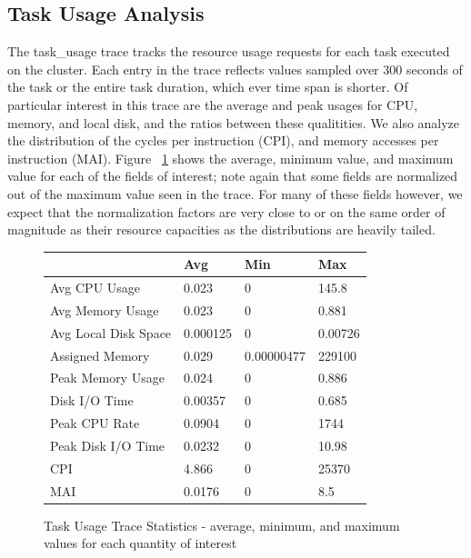 \documentclass{sig-alternate}
\begin{document}



\subsection{Task Usage Analysis}

The task\_usage trace tracks the resource usage requests for each task executed on the cluster.
Each entry in the trace reflects values sampled over 300 seconds of the task or the entire task duration, which ever time span is shorter.
Of particular interest in this trace are the average and peak usages for CPU, memory, and local disk, and the ratios between these qualitities.
We also analyze the distribution of the cycles per instruction (CPI), and memory accesses per instruction (MAI).
Figure ~\ref{task_usage_stats} shows the average, minimum value, and maximum value for each of the fields of interest; note again that some fields are normalized out of the maximum value seen in the trace.
For many of these fields however, we expect that the normalization factors are very close to or on the same order of magnitude as their resource capacities as the distributions are heavily tailed.

\begin{figure}
\centering
\begin{tabular}{| p{2.5cm} | p{1.5cm} | p{1.5cm} | p{1.5cm} |} \hline
 & Avg & Min & Max \\ \hline
Avg CPU Usage & 0.023 & 0 & 145.8 \\ \hline
Avg Memory Usage & 0.023 & 0 & 0.881 \\ \hline
Avg Local Disk Space & 0.000125 & 0 & 0.00726 \\ \hline
Assigned Memory & 0.029 & 0.00000477 & 229100\* \\ \hline
Peak Memory Usage & 0.024 & 0 & 0.886 \\ \hline
Disk I/O Time & 0.00357 & 0 & 0.685 \\ \hline
Peak CPU Rate & 0.0904 & 0 & 1744\* \\ \hline
Peak Disk I/O Time & 0.0232 & 0 & 10.98 \\ \hline
CPI & 4.866 & 0 & 25370\* \\ \hline
MAI & 0.0176 & 0 & 8.5\* \\ \hline
\end{tabular}
\caption{Task Usage Trace Statistics - average, minimum, and maximum values for each quantity of interest}
\label{task_usage_stats}
\end{figure}
\end{document}
